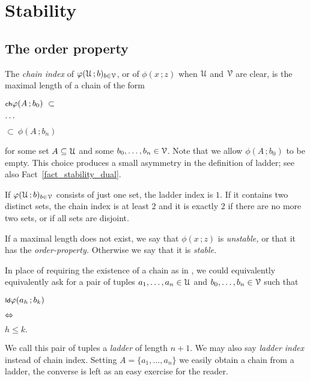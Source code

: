 \documentclass[scombinatorics.tex]{subfiles}
\begin{document}
\chapter{Stability}
\label{sauer}



\def\medrel#1{\parbox[t]{5ex}{$\displaystyle\hfil #1$}}
\def\ceq#1#2#3{\parbox[t]{20ex}{$\displaystyle #1$}\medrel{#2}{$\displaystyle #3$}}


\section{The order property}\label{ladder}

The \emph{chain index\/} of $\varphi(\EuScript U\,;b)_{b\in\EuScript V}$, or of $\phi(x\,;z)$ when $\EuScript U$ and $\EuScript V$ are clear, is the maximal length of a chain of the form

\ceq{\ssf{ch}\hfill\phi(A\,;b_0)\ \subset}{\dots}{\subset\ \phi(A\,;b_n)}

for some set $A\subseteq\EuScript U$ and some $b_0,\dots,b_n\in\EuScript V$.
Note that we allow $\phi(A\,;b_0)$ to be empty.
This choice produces a small asymmetry in the definition of ladder; see also Fact~\ref{fact_stability_dual}.


\begin{example}
  If $\varphi(\EuScript U\,;b)_{b\in\EuScript V}$ consists of just one set, the ladder index is $1$.
  If it contains two distinct sets, the  chain index is at least $2$ and it is exactly $2$ if there are no more two sets, or if all sets are disjoint.\QED
\end{example}

If a maximal length does not exist, we say that $\phi(x\,;z)$ is \emph{unstable,} or that it has the \emph{order-property.} 
Otherwise we say that it is \emph{stable.}

In place of requiring the existence of a chain as in , we could equivalently equivalently ask for a pair of tuples $a_1,\dots,a_n\in\EuScript U$ and $b_0,\dots,b_n\in\EuScript V$ such that

\ceq{\ssf{ld}\hfill\phi(a_h\,;b_k)}
{\IFF}
{h\le k.}

We call this pair of tuples a \emph{ladder\/} of length $n+1$.
We may also say \emph{ladder index\/} instead of chain index.
Setting $A=\{a_1,\dots,a_n\}$ we easily obtain a chain from a ladder, the converse is left as an easy exercise for the reader.
\end{document}
